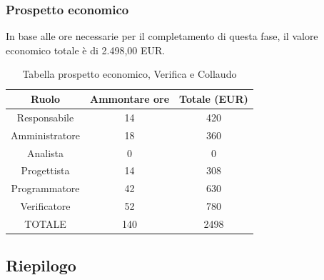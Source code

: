 \subsubsection{Prospetto economico}
In base alle ore necessarie per il completamento di questa fase, il valore economico totale è di 2.498,00 EUR.
\begin{table}[h]
\caption{Tabella prospetto economico, Verifica e Collaudo}  
\begin{center}
\begin{tabular}{ |c|c|c|  }
 \hline
 Ruolo 		& Ammontare ore 	& Totale (EUR)\\
 \hline
 \hline
 	Responsabile	& 14 	& 420\\
	Amministratore	& 18		& 360\\
	Analista		& 0 		& 0\\
	Progettista		& 14		& 308\\
	Programmatore	& 42		& 630\\
	Verificatore	& 52 	& 780\\
 \hline\hline
 TOTALE		& 140		& 2498\\
  \hline
\end{tabular}
\end{center}
\end{table}
\newpage
\subsection{Riepilogo}
